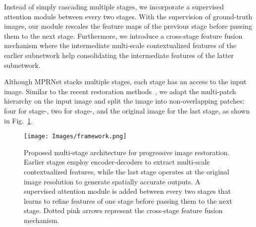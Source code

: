 \documentclass[10pt,twocolumn,letterpaper]{article}
\begin{document}
Instead of simply cascading multiple stages, we incorporate a supervised attention module between every two stages. 
With the supervision of ground-truth images, our module rescales the feature maps of the previous stage before passing them to the next stage. 
Furthermore, we introduce a cross-stage feature fusion mechanism where the intermediate multi-scale contextualized features of the earlier subnetwork help consolidating the intermediate features of the latter subnetwork. 

Although MPRNet stacks multiple stages, each stage has an access to the input image. 
Similar to the recent restoration methods~\cite{Maitreya2020,dmphn2019}, we adapt the multi-patch hierarchy on the input image and split the image into non-overlapping patches: four for stage-, two for stage-, and the original image for the last stage, as shown in Fig.~\ref{fig:framework}.    



\begin{figure}[t!]
\begin{center}
 \texttt{[image: Images/framework.png]}  
\end{center}\vspace{-1.4em}
    \caption{ \small 
    Proposed multi-stage architecture for progressive image restoration. Earlier stages employ encoder-decoders to extract multi-scale contextualized features, while the last stage operates at the original image resolution to generate spatially accurate outputs.    
    A supervised attention module is added between every two stages that learns to refine features of one stage before passing them to the next stage. Dotted pink arrows represent the cross-stage feature fusion mechanism. }
    \label{fig:framework}
\vspace{-1em}
\end{figure}
\end{document}
